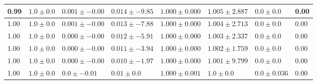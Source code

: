 \begin{tabular}{L{1in}|L{1in}|L{1in}|L{1in}|L{1in}|L{1in}|L{1in}|L{1in}}
0.99& $1.0  \pm  0.0$ & $0.001  \pm  -0.00$ & $0.014  \pm  -9.85$ & $1.000  \pm  0.000$ & $1.005  \pm  2.887$ & $0.0  \pm  0.0$ &0.00\\& $1.0  \pm  0.0$ & $0.001  \pm  -0.00$ & $0.013  \pm  -7.88$ & $1.000  \pm  0.000$ & $1.004  \pm  2.713$ & $0.0  \pm  0.0$ &0.00\\& $1.0  \pm  0.0$ & $0.000  \pm  -0.00$ & $0.012  \pm  -5.91$ & $1.000  \pm  0.000$ & $1.003  \pm  2.337$ & $0.0  \pm  0.0$ &0.00\\& $1.0  \pm  0.0$ & $0.000  \pm  -0.00$ & $0.011  \pm  -3.94$ & $1.000  \pm  0.000$ & $1.002  \pm  1.759$ & $0.0  \pm  0.0$ &0.00\\& $1.0  \pm  0.0$ & $0.000  \pm  -0.00$ & $0.010  \pm  -1.97$ & $1.000  \pm  0.000$ & $1.001  \pm  9.799$ & $0.0  \pm  0.0$ &0.00\\& $1.0  \pm  0.0$ & $0.0  \pm  -0.01$ & $0.01  \pm  0.0$ & $1.000  \pm  0.001$ & $1.0  \pm  0.0$ & $0.0  \pm  0.036$ &0.00\\\hline
\hline\end{tabular}
